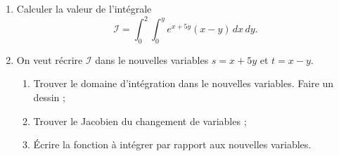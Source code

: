 \begin{exercice}\label{exoGeomAnal-0020}

  \begin{enumerate}
  \item Calculer la valeur de l'intégrale 
    \[
    \mathcal{I}=\int_0^2\int_0^{y} e^{x+5y}(x-y)\,dx\,dy.
    \]
  \item On veut récrire $\mathcal{I}$ dans le nouvelles variables $s=x+5y$ et $t=x-y$. 
    \begin{enumerate}
    \item Trouver le domaine d'intégration dans le nouvelles variables. Faire un dessin ;
    \item Trouver le Jacobien du changement de variables ; 
    \item Écrire la fonction à intégrer par rapport aux nouvelles variables. 
    \end{enumerate}
  \end{enumerate}


\end{exercice}
